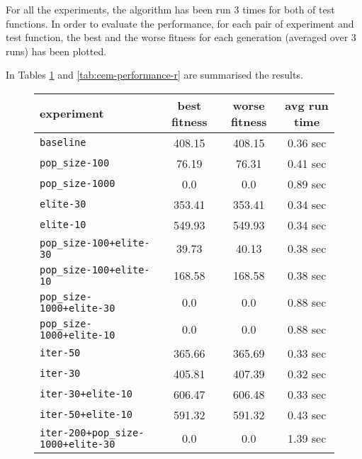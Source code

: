 For all the experiments, the algorithm has been run 3 times for both of test functions. In order to evaluate the performance, for each pair of experiment and test function, the best and the worse fitness for each generation (averaged over 3 runs) has been plotted. 

In Tables \ref{tab:cem-performance-s} and \ref{tab:cem-performance-r} are summarised the results.

\begin{figure}[htb]
	\centering
	
	\begin{tabular}{lccc}
		\toprule
		\textbf{experiment} & \textbf{best fitness} & \textbf{worse fitness} & \textbf{avg run time} \\
		\midrule
		\texttt{baseline 						}	& 408.15 &                408.15 &                 0.36 sec \\
		\texttt{pop\_size-100 					}	&   76.19 &                 76.31 &                 0.41 sec \\
		\texttt{pop\_size-1000 					}	&     0.0 &                   0.0 &                 0.89 sec \\
		\texttt{elite-30 						}	& 353.41 &                353.41 &                 0.34 sec \\
		\texttt{elite-10 						}	& 549.93 &                549.93 &                 0.34 sec \\
		\texttt{pop\_size-100+elite-30 			}	&   39.73 &                 40.13 &                 0.38 sec \\
		\texttt{pop\_size-100+elite-10 			}	&  168.58 &                168.58 &                 0.38 sec \\
		\texttt{pop\_size-1000+elite-30 		}	&     0.0 &                   0.0 &                 0.88 sec \\
		\texttt{pop\_size-1000+elite-10 		}	&     0.0 &                   0.0 &                 0.88 sec \\
		\texttt{iter-50 						}	& 365.66 &                365.69 &                 0.33 sec \\
		\texttt{iter-30 						}	& 405.81 &                407.39 &                 0.32 sec \\
		\texttt{iter-30+elite-10 				}	& 606.47 &                606.48 &                 0.33 sec \\
		\texttt{iter-50+elite-10 				}	& 591.32 &                591.32 &                 0.43 sec \\
		\texttt{iter-200+pop\_size-1000+elite-30} 	&     0.0 &                   0.0 &                 1.39 sec \\	
		\bottomrule
	\end{tabular}
	\label{tab:cem-performance-s}
\end{figure}

